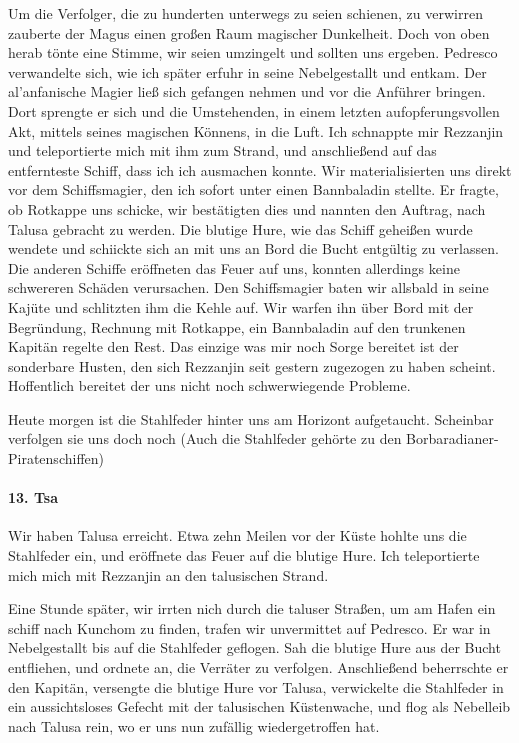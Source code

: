 Um die Verfolger, die zu hunderten unterwegs zu seien schienen, zu verwirren zauberte der Magus einen großen Raum magischer Dunkelheit. Doch von oben herab tönte eine Stimme, wir seien umzingelt und sollten uns ergeben. Pedresco verwandelte sich, wie ich später erfuhr in seine Nebelgestallt und entkam. Der al'anfanische Magier ließ sich gefangen nehmen und vor die Anführer bringen. Dort sprengte er sich und die Umstehenden, in einem letzten aufopferungsvollen Akt, mittels seines magischen Könnens, in die Luft. Ich schnappte mir Rezzanjin und teleportierte mich mit ihm zum Strand, und anschließend auf das entfernteste Schiff, dass ich ich ausmachen konnte. Wir materialisierten uns direkt vor dem Schiffsmagier, den ich sofort unter einen Bannbaladin stellte. Er fragte, ob Rotkappe uns schicke, wir bestätigten dies und nannten den Auftrag, nach Talusa gebracht zu werden. Die blutige Hure, wie das Schiff geheißen wurde wendete und schiickte sich an mit uns an Bord die Bucht entgültig zu verlassen. Die anderen Schiffe eröffneten das Feuer auf uns, konnten allerdings keine schwereren Schäden verursachen. Den Schiffsmagier baten wir allsbald in seine Kajüte und schlitzten ihm die Kehle auf. Wir warfen ihn über Bord mit der Begründung, Rechnung mit Rotkappe, ein Bannbaladin auf den trunkenen Kapitän regelte den Rest. Das einzige was mir noch Sorge bereitet ist der sonderbare Husten, den sich Rezzanjin seit gestern zugezogen zu haben scheint. Hoffentlich bereitet der uns nicht noch schwerwiegende Probleme.

Heute morgen ist die Stahlfeder hinter uns am Horizont aufgetaucht. Scheinbar verfolgen sie uns doch noch (Auch die Stahlfeder gehörte zu den Borbaradianer-Piratenschiffen)

\paragraph{13. Tsa}
Wir haben Talusa erreicht. Etwa zehn Meilen vor der Küste hohlte uns die Stahlfeder ein, und eröffnete das Feuer auf die blutige Hure. Ich teleportierte mich mich mit Rezzanjin an den talusischen Strand.

Eine Stunde später, wir irrten nich durch die taluser Straßen, um am Hafen ein schiff nach Kunchom zu finden, trafen wir unvermittet auf Pedresco. Er war in Nebelgestallt bis auf die Stahlfeder geflogen. Sah die blutige Hure aus der Bucht entfliehen, und ordnete an, die Verräter zu verfolgen. Anschließend beherrschte er den Kapitän, versengte die blutige Hure vor Talusa, verwickelte die Stahlfeder in ein aussichtsloses Gefecht mit der talusischen Küstenwache, und flog als Nebelleib nach Talusa rein, wo er uns nun zufällig wiedergetroffen hat.

